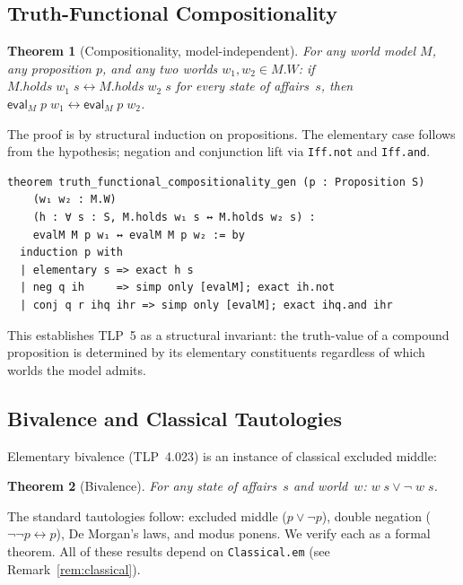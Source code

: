 \documentclass[10pt, letterpaper]{article}
\newtheorem{theorem}{Theorem}[section]
\theoremstyle{definition}
\theoremstyle{remark}
\newcommand{\eval}{\mathsf{eval}}
\begin{document}
\subsection{Truth-Functional Compositionality}
\label{sec:compositionality}

\begin{theorem}[Compositionality, model-independent]
\label{thm:compositionality}
For any world model $M$, any proposition $p$, and any two
worlds $w_1, w_2 \in M.W$: if $M.\mathit{holds}\;w_1\;s
\leftrightarrow M.\mathit{holds}\;w_2\;s$ for every state of
affairs~$s$, then $\eval_M\;p\;w_1 \leftrightarrow
\eval_M\;p\;w_2$.
\end{theorem}

\noindent
The proof is by structural induction on propositions.
The elementary case follows from the hypothesis; negation and
conjunction lift via \texttt{Iff.not} and \texttt{Iff.and}.

\begin{lstlisting}
theorem truth_functional_compositionality_gen (p : Proposition S)
    (w₁ w₂ : M.W)
    (h : ∀ s : S, M.holds w₁ s ↔ M.holds w₂ s) :
    evalM M p w₁ ↔ evalM M p w₂ := by
  induction p with
  | elementary s => exact h s
  | neg q ih     => simp only [evalM]; exact ih.not
  | conj q r ihq ihr => simp only [evalM]; exact ihq.and ihr
\end{lstlisting}

\noindent
This establishes TLP~5 as a structural invariant: the
truth-value of a compound proposition is determined by its
elementary constituents regardless of which worlds the model
admits.

\subsection{Bivalence and Classical Tautologies}
\label{sec:bivalence}

Elementary bivalence (TLP~4.023) is an instance of classical
excluded middle:

\begin{theorem}[Bivalence]
For any state of affairs~$s$ and world~$w$: $w\;s \lor \lnot\;w\;s$.
\end{theorem}

\noindent
The standard tautologies follow: excluded middle ($p \lor
\lnot p$), double negation ($\lnot\lnot p \leftrightarrow p$),
De Morgan's laws, and modus ponens.  We verify each as a formal
theorem.  All of these results depend on \texttt{Classical.em}
(see Remark~\ref{rem:classical}).
\end{document}

